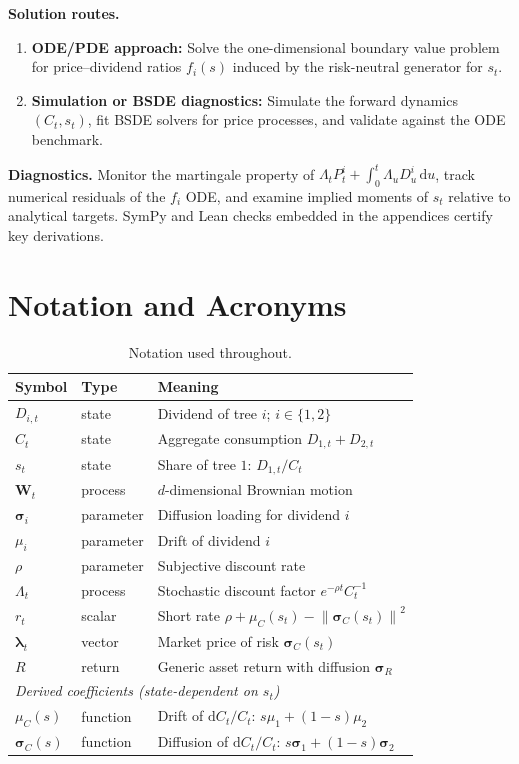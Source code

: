 ﻿\documentclass[11pt,letterpaper,oneside]{article}
\numberwithin{equation}{section}
\newcommand{\1}{\mathbf{1}}
\newcommand{\diff}{\mathrm{d}}
\newcommand{\norm}[1]{\left\lVert #1\right\rVert}
\begin{document}
\textbf{Solution routes.}
\begin{enumerate}[leftmargin=1.25em]
  \item \textbf{ODE/PDE approach:} Solve the one-dimensional boundary value problem for price--dividend ratios $f_i(s)$ induced by the risk-neutral generator for $s_t$.
  \item \textbf{Simulation or BSDE diagnostics:} Simulate the forward dynamics $(C_t,s_t)$, fit BSDE solvers for price processes, and validate against the ODE benchmark.
\end{enumerate}

\textbf{Diagnostics.} Monitor the martingale property of $\Lambda_t P^i_t+\int_0^t \Lambda_u D^i_u\,\diff u$, track numerical residuals of the $f_i$ ODE, and examine implied moments of $s_t$ relative to analytical targets. SymPy and Lean checks embedded in the appendices certify key derivations.


\newpage
\section{Notation and Acronyms}

\begin{table}[ht]
  \centering
  \small
  \begin{tabular}{@{} l l p{}@{}}
  \toprule
  \textbf{Symbol} & \textbf{Type} & \textbf{Meaning} \\
  \midrule
  $D_{i,t}$ & state & Dividend of tree $i$; $i\in\{1,2\}$ \\
  $C_t$ & state & Aggregate consumption $D_{1,t}+D_{2,t}$ \\
  $s_t$ & state & Share of tree $1$: $D_{1,t}/C_t$ \\
  $\bm{W}_t$ & process & $d$-dimensional Brownian motion \\
  $\bm{\sigma}_i$ & parameter & Diffusion loading for dividend $i$ \\
  $\mu_i$ & parameter & Drift of dividend $i$ \\
  $\rho$ & parameter & Subjective discount rate \\
  $\Lambda_t$ & process & Stochastic discount factor $e^{-\rho t} C_t^{-1}$ \\
  $r_t$ & scalar & Short rate $\rho+\mu_C(s_t)-\norm{\bm{\sigma}_C(s_t)}^2$ \\
  $\bm{\lambda}_t$ & vector & Market price of risk $\bm{\sigma}_C(s_t)$ \\
  $R$ & return & Generic asset return with diffusion $\bm{\sigma}_R$ \\
  \midrule
  \multicolumn{3}{l}{\textit{Derived coefficients (state-dependent on $s_t$)}} \\
  $\mu_C(s)$ & function & Drift of $\diff C_t/C_t$: $s\mu_1+(1-s)\mu_2$ \\
  $\bm{\sigma}_C(s)$ & function & Diffusion of $\diff C_t/C_t$: $s\bm{\sigma}_1+(1-s)\bm{\sigma}_2$ \\
  \bottomrule
  \end{tabular}
  \caption{Notation used throughout.}
\end{table}
\end{document}

